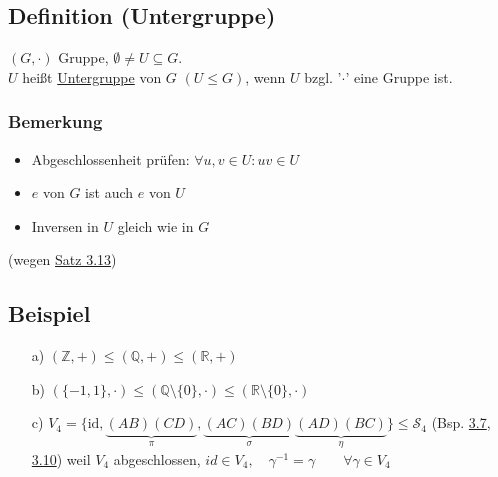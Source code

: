 \documentclass[12pt,titlepage, pdf]{article}
\newcommand{\R}{\mathds{R}}
\newcommand{\uline}[1]{\underline{#1}}
\newcommand{\id}{\textrm{id}}
\renewcommand{\>}{\rightarrow}
\renewcommand{\*}{\cdot}
\begin{document}
\subsection{Definition (Untergruppe)}
$(G, \cdot)$ Gruppe, $\emptyset \neq U \subseteq G$.\\
 $U$ heißt \uline{Untergruppe} von $G$ $(U \leq G)$, wenn $U$ bzgl. '$\cdot$' eine Gruppe ist.
 
 \subsubsection*{Bemerkung}
 \begin{itemize}
 	\item Abgeschlossenheit prüfen: $\forall u,v  \in U: uv \in U$
 	\item $e$ von $G$ ist auch $e$ von $U$
 	\item Inversen in $U$ gleich wie in $G$
 \end{itemize}
(wegen \hyperref[3.13]{Satz 3.13})
\subsection{Beispiel}
\label{3.16}
\begin{itemize}
	\item[a)] $(\mathds{Z}, +) \leq (\mathds{Q}, + ) \leq (\R, + )$
	\item[b)] $(\{-1,1\}, \cdot) \leq (\mathds{Q}\setminus \{0\}, \cdot) \leq (\R \setminus\{0\}, \cdot)$
	\item[c)] $V_4 = \{\id,\underbrace{(AB)(CD)}_{\pi},\underbrace{(AC)(BD)}_{\sigma} \underbrace{(AD)(BC)}_{\eta}\} \leq \mathscr{S}_4$ (Bsp. \hyperref[3.7]{3.7}, \hyperref[3.10]{3.10}) weil $V_4$ abgeschlossen, $id \in V_4,\quad \gamma^{-1} = \gamma \qquad \forall \gamma \in V_4$
\end{itemize}
\end{document}
